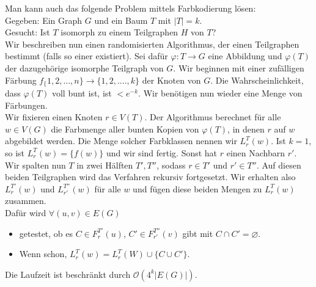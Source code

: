 \documentclass[a4paper, 12pt]{article}
\theoremstyle{plain}
\theoremstyle{definition}
\theoremstyle{lemma}
\theoremstyle{remark}
\theoremstyle{corollary}
\theoremstyle{example}
\begin{document}
	Man kann auch das folgende Problem mittels Farbkodierung lösen:\\
	Gegeben: Ein Graph $G$ und ein Baum $T$ mit $\left|T\right| = k$.\\
	Gesucht: Ist $T$ isomorph zu einem Teilgraphen $H$ von $T$?\\
	Wir beschreiben nun einen randomisierten Algorithmus, der einen Teilgraphen bestimmt (falls so einer existiert). Sei dafür $\varphi: T \to G$ eine Abbildung und $\varphi(T)$ der dazugehörige isomorphe Teilgraph von $G$. Wir beginnen mit einer zufälligen Färbung $f_ \{1,2,...,n\} \to \{1,2,....,k\}$ der Knoten von $G$. Die Wahrscheinlichkeit, dass $\varphi(T)$ voll bunt ist, ist $< e^{-k}$. Wir benötigen nun wieder eine Menge von Färbungen.\\
	Wir fixieren einen Knoten $r \in V(T)$. Der Algorithmus berechnet für alle $w \in V(G)$ die Farbmenge aller bunten Kopien von $\varphi(T)$, in denen $r$ auf $w$ abgebildet werden. Die Menge solcher Farbklassen nennen wir $L^T_r(w)$. Ist $k=1$, so ist $L^T_r(w) = \{f(w)\}$ und wir sind fertig. Sonst hat $r$ einen Nachbarn $r'$. Wir spalten nun $T$ in zwei Hälften $T',T''$, sodass $r \in T'$ und $r' \in T''$. Auf diesen beiden Teilgraphen wird das Verfahren rekursiv fortgesetzt. Wir erhalten also $L^{T'}_{r}(w)$ und $L^{T''}_{r'}(w)$ für alle $w$ und fügen diese beiden Mengen zu $L^T_r(w)$ zusammen.\\
	Dafür wird $\forall (u,v) \in E(G)$ \begin{itemize}
		\item getestet, ob es $C \in F^{T'}_{r}(u)$, $C' \in F^{T''}_{r'}(v)$ gibt mit $C\cap C' = \varnothing$.
		\item Wenn schon, $L^T_r(w) = L^T_r(W) \cup \{C \cup C'\}$.
	\end{itemize}
	Die Laufzeit ist beschränkt durch $\mathcal{O}(4^k \left|E(G)\right|)$.
\end{document}
